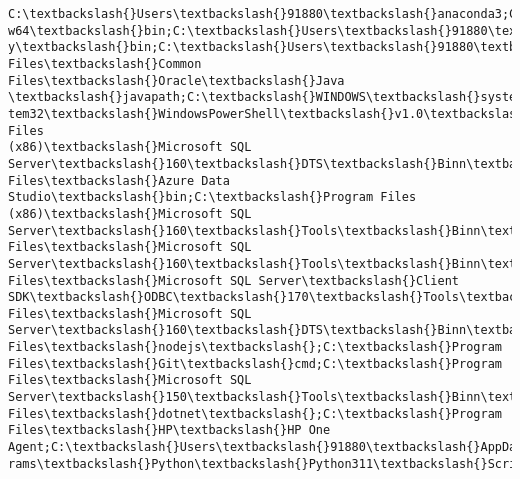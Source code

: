 \documentclass[11pt]{article}
\begin{document}
    \begin{Verbatim}[commandchars=\\\{\}]
C:\textbackslash{}Users\textbackslash{}91880\textbackslash{}anaconda3;C:\textbackslash{}Users\textbackslash{}91880\textbackslash{}anaconda3\textbackslash{}Library\textbackslash{}mingw-
w64\textbackslash{}bin;C:\textbackslash{}Users\textbackslash{}91880\textbackslash{}anaconda3\textbackslash{}Library\textbackslash{}usr\textbackslash{}bin;C:\textbackslash{}Users\textbackslash{}91880\textbackslash{}anaconda3\textbackslash{}Librar
y\textbackslash{}bin;C:\textbackslash{}Users\textbackslash{}91880\textbackslash{}anaconda3\textbackslash{}Scripts;C:\textbackslash{}Program Files\textbackslash{}Common Files\textbackslash{}Oracle\textbackslash{}Java
\textbackslash{}javapath;C:\textbackslash{}WINDOWS\textbackslash{}system32;C:\textbackslash{}WINDOWS;C:\textbackslash{}WINDOWS\textbackslash{}System32\textbackslash{}Wbem;C:\textbackslash{}WINDOWS\textbackslash{}Sys
tem32\textbackslash{}WindowsPowerShell\textbackslash{}v1.0\textbackslash{};C:\textbackslash{}WINDOWS\textbackslash{}System32\textbackslash{}OpenSSH\textbackslash{};C:\textbackslash{}Program Files
(x86)\textbackslash{}Microsoft SQL Server\textbackslash{}160\textbackslash{}DTS\textbackslash{}Binn\textbackslash{};C:\textbackslash{}Program Files\textbackslash{}Azure Data
Studio\textbackslash{}bin;C:\textbackslash{}Program Files (x86)\textbackslash{}Microsoft SQL
Server\textbackslash{}160\textbackslash{}Tools\textbackslash{}Binn\textbackslash{};C:\textbackslash{}Program Files\textbackslash{}Microsoft SQL
Server\textbackslash{}160\textbackslash{}Tools\textbackslash{}Binn\textbackslash{};C:\textbackslash{}Program Files\textbackslash{}Microsoft SQL Server\textbackslash{}Client
SDK\textbackslash{}ODBC\textbackslash{}170\textbackslash{}Tools\textbackslash{}Binn\textbackslash{};C:\textbackslash{}Program Files\textbackslash{}Microsoft SQL
Server\textbackslash{}160\textbackslash{}DTS\textbackslash{}Binn\textbackslash{};C:\textbackslash{}Program Files\textbackslash{}nodejs\textbackslash{};C:\textbackslash{}Program
Files\textbackslash{}Git\textbackslash{}cmd;C:\textbackslash{}Program Files\textbackslash{}Microsoft SQL Server\textbackslash{}150\textbackslash{}Tools\textbackslash{}Binn\textbackslash{};C:\textbackslash{}Program
Files\textbackslash{}dotnet\textbackslash{};C:\textbackslash{}Program Files\textbackslash{}HP\textbackslash{}HP One Agent;C:\textbackslash{}Users\textbackslash{}91880\textbackslash{}AppData\textbackslash{}Local\textbackslash{}Prog
rams\textbackslash{}Python\textbackslash{}Python311\textbackslash{}Scripts\textbackslash{};C:\textbackslash{}Users\textbackslash{}91880\textbackslash{}AppData\textbackslash{}Local\textbackslash{}Programs\textbackslash{}Python\textbackslash{}Pyth

\end{Verbatim}
\end{document}

